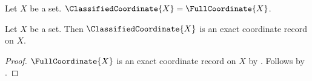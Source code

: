 

\begin{definition}\label{classified_coordinate_definition}
    Let $X$ be a set.
    $\ClassifiedCoordinate{X}=\FullCoordinate{X}$.
\end{definition}

\begin{classification}\label{coordinate_classification}
    Let $X$ be a set.
    Then $\ClassifiedCoordinate{X}$ is an exact coordinate record on $X$.
\end{classification}
\begin{proof}
    $\FullCoordinate{X}$ is an exact coordinate record on $X$
        by .
    Follows by .
\end{proof}
